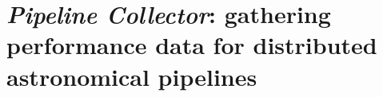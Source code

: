 

\chapter[Pipeline Collector]{\textit{Pipeline Collector}: gathering performance data for distributed astronomical pipelines}\label{ch:pipeline_collector}
\setcounter{footnote}{0}

\author{Alexandar P. Mechev$^a$ }

\author{Aske Plaat$^b$}%
\author{J.B. Raymond Oonk$^a$$^,$$^c$}%
\author{Huib T. Intema$^a$}%
\author{Huub J.A. R\"ottgering$^a$}%

\date{\today}%

